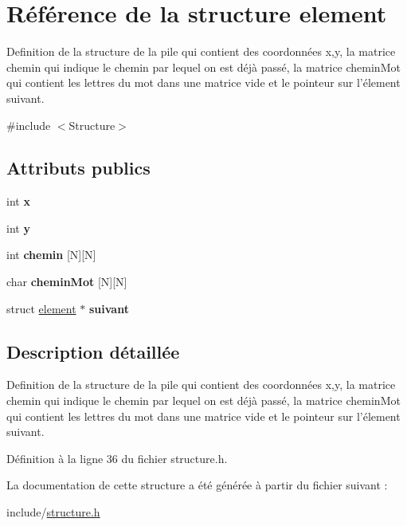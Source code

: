 \hypertarget{structelement}{\section{Référence de la structure element}
\label{structelement}
}


Definition de la structure de la pile qui contient des coordonnées x,y, la matrice chemin qui indique le chemin par lequel on est déjà passé, la matrice chemin\-Mot qui contient les lettres du mot dans une matrice vide et le pointeur sur l'élement suivant.  




{\ttfamily \#include $<$Structure$>$}

\subsection*{Attributs publics}
\begin{DoxyCompactItemize}
\item 
\hypertarget{structelement_a18e88a462664541872b1018c06289ead}{int {\bfseries x}}\label{structelement_a18e88a462664541872b1018c06289ead}

\item 
\hypertarget{structelement_a434c348427ff30755ba723ab1180d070}{int {\bfseries y}}\label{structelement_a434c348427ff30755ba723ab1180d070}

\item 
\hypertarget{structelement_a28553e86dd9c0b009a5abf35a0aabc0c}{int {\bfseries chemin} \mbox{[}N\mbox{]}\mbox{[}N\mbox{]}}\label{structelement_a28553e86dd9c0b009a5abf35a0aabc0c}

\item 
\hypertarget{structelement_a354f5cb4a63d5fac439df62ce3c9772a}{char {\bfseries chemin\-Mot} \mbox{[}N\mbox{]}\mbox{[}N\mbox{]}}\label{structelement_a354f5cb4a63d5fac439df62ce3c9772a}

\item 
\hypertarget{structelement_a4f1534ded1f9373e0843568bf94ea754}{struct \hyperlink{structelement}{element} $\ast$ {\bfseries suivant}}\label{structelement_a4f1534ded1f9373e0843568bf94ea754}

\end{DoxyCompactItemize}


\subsection{Description détaillée}
Definition de la structure de la pile qui contient des coordonnées x,y, la matrice chemin qui indique le chemin par lequel on est déjà passé, la matrice chemin\-Mot qui contient les lettres du mot dans une matrice vide et le pointeur sur l'élement suivant. 

Définition à la ligne 36 du fichier structure.\-h.



La documentation de cette structure a été générée à partir du fichier suivant \-:\begin{DoxyCompactItemize}
\item 
include/\hyperlink{structure_8h}{structure.\-h}\end{DoxyCompactItemize}
